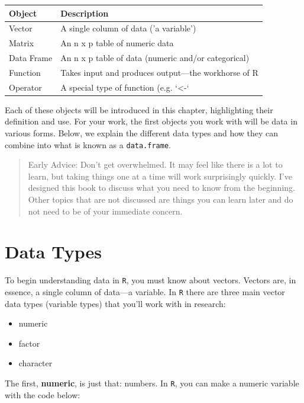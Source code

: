 \documentclass[]{tufte-book}
\providecommand{\tightlist}{%
  \setlength{\itemsep}{0pt}\setlength{\parskip}{0pt}}
\theoremstyle{definition}
\theoremstyle{definition}
\theoremstyle{remark}
\begin{document}
\begin{tabular}{l|l}
\hline
Object & Description\\
\hline
Vector & A single column of data ('a variable')\\
\hline
Matrix & An n x p table of numeric data\\
\hline
Data Frame & An n x p table of data (numeric and/or categorical)\\
\hline
Function & Takes input and produces output---the workhorse of R\\
\hline
Operator & A special type of function (e.g. `<-`\\
\hline
\end{tabular}

Each of these objects will be introduced in this chapter, highlighting
their definition and use. For your work, the first objects you work with
will be data in various forms. Below, we explain the different data
types and how they can combine into what is known as a
\texttt{data.frame}.

\begin{quote}
Early Advice: Don't get overwhelmed. It may feel like there is a lot to
learn, but taking things one at a time will work surprisingly quickly.
I've designed this book to discuss what you need to know from the
beginning. Other topics that are not discussed are things you can learn
later and do not need to be of your immediate concern.
\end{quote}

\section*{Data Types}\label{data-types}

To begin understanding data in \texttt{R}, you must know about vectors.
Vectors are, in essence, a single column of data---a variable. In
\texttt{R} there are three main vector data types (variable types) that
you'll work with in research:

\begin{itemize}
\tightlist
\item
  numeric
\item
  factor
\item
  character
\end{itemize}

The first, \textbf{numeric}, is just that: numbers. In \texttt{R}, you
can make a numeric variable with the code below:
\end{document}
